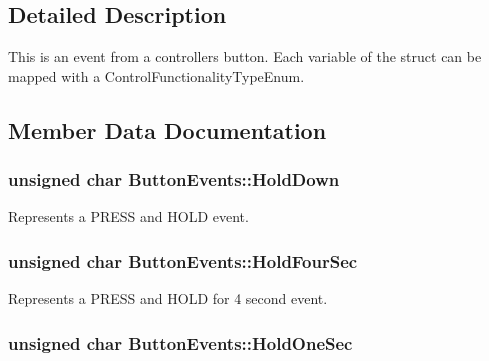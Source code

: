 \subsection{Detailed Description}
This is an event from a controller\textquotesingle{}s button. Each variable of the struct can be mapped with a Control\+Functionality\+Type\+Enum. 

\subsection{Member Data Documentation}
\subsubsection[{\texorpdfstring{Hold\+Down}{HoldDown}}]{\setlength{\rightskip}{0pt plus 5cm}unsigned char Button\+Events\+::\+Hold\+Down}\hypertarget{struct_button_events_ad995e95da85ebfa27b5d4dedaa771b92}{}\label{struct_button_events_ad995e95da85ebfa27b5d4dedaa771b92}


Represents a P\+R\+E\+SS and H\+O\+LD event. 

\subsubsection[{\texorpdfstring{Hold\+Four\+Sec}{HoldFourSec}}]{\setlength{\rightskip}{0pt plus 5cm}unsigned char Button\+Events\+::\+Hold\+Four\+Sec}\hypertarget{struct_button_events_a9c871beb62f78a16231448b5718c5128}{}\label{struct_button_events_a9c871beb62f78a16231448b5718c5128}


Represents a P\+R\+E\+SS and H\+O\+LD for 4 second event. 

\subsubsection[{\texorpdfstring{Hold\+One\+Sec}{HoldOneSec}}]{\setlength{\rightskip}{0pt plus 5cm}unsigned char Button\+Events\+::\+Hold\+One\+Sec}\hypertarget{struct_button_events_a7ef7e7cbb9addb84a1319b7cf635520f}{}\label{struct_button_events_a7ef7e7cbb9addb84a1319b7cf635520f}



